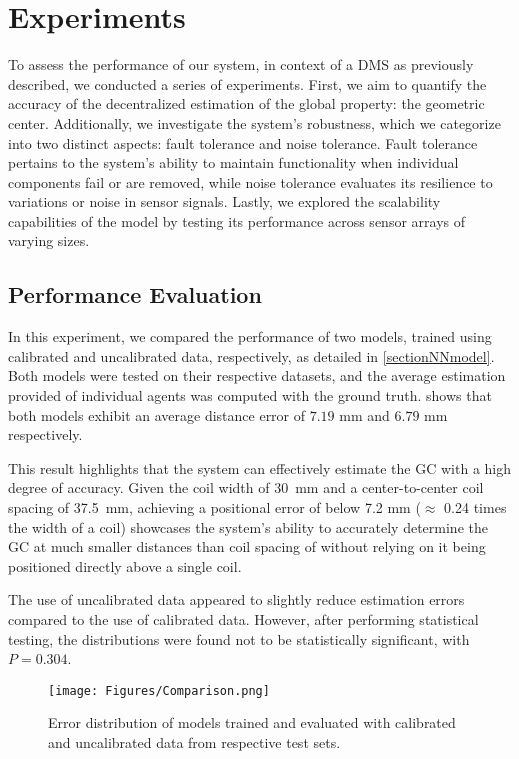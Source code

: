 \section{Experiments}

To assess the performance of our system, in context of a \ac{DMS} as previously described, we conducted a series of experiments. First, we aim to quantify the accuracy of the decentralized estimation of the global property: the geometric center. Additionally, we investigate the system's robustness, which we categorize into two distinct aspects: fault tolerance and noise tolerance. Fault tolerance pertains to the system's ability to maintain functionality when individual components fail or are removed, while noise tolerance evaluates its resilience to variations or noise in sensor signals. Lastly, we explored the scalability capabilities of the model by testing its performance across sensor arrays of varying sizes. %

\subsection{Performance Evaluation}
\label{ss:perfeval}

In this experiment, we compared the performance of two models, trained using calibrated and uncalibrated data, respectively, as detailed in \cref{sectionNNmodel}. Both models were tested on their respective datasets, and the average estimation provided of individual agents was computed with the ground truth.  shows that both models exhibit an average distance error of $7.19$ mm and $6.79$ mm respectively.

This result highlights that the system can effectively estimate the \ac{GC} with a high degree of accuracy. Given the coil width of 30~mm and a center-to-center coil spacing of 37.5~mm, achieving a positional error of below 7.2 mm ($\approx$ 0.24 times the width of a coil) showcases the system’s ability to accurately determine the \ac{GC} at much smaller distances than coil spacing of without relying on it being positioned directly above a single coil. 

The use of uncalibrated data appeared to slightly reduce estimation errors compared to the use of calibrated data. However, after performing statistical testing, the distributions were found not to be statistically significant, with $P= 0.304$.

\begin{figure}[t]
\centerline{\texttt{[image: Figures/Comparison.png]}}
\caption{Error distribution of models trained and evaluated with calibrated and uncalibrated data from respective test sets.}
\label{fig:comparison}
\end{figure}


